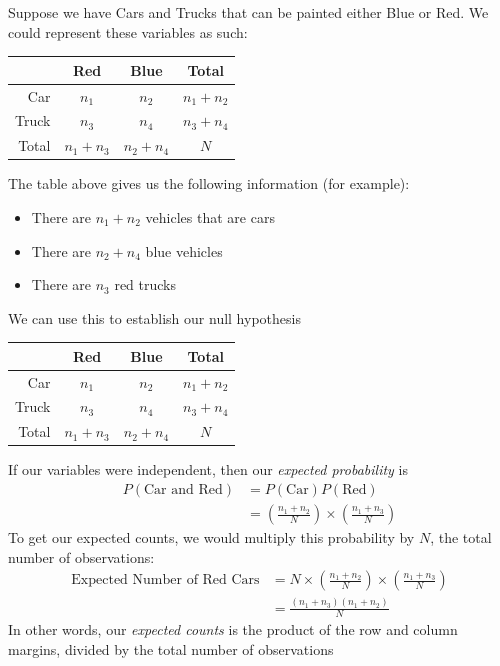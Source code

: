 \documentclass{beamer}
\begin{document}
\begin{frame}
Suppose we have Cars and Trucks that can be painted either Blue or Red. We could represent these variables as such:
\begin{table}[ht]
\centering
\begin{tabular}{rcc|c}
  \hline
 & Red & Blue & Total\\
  \hline
Car & $n_1$ & $n_2$ &  $n_1+n_2$ \\ 
Truck & $n_3$ &  $n_4$ & $n_3+n_4$ \\ 
   \hline
Total & $n_1 + n_3$ & $n_2 + n_4$ & $N$ \\ \hline
\end{tabular}
\end{table}
The table above gives us the following information (for example):
\begin{itemize}
\item There are $n_1 + n_2$ vehicles that are cars
\item There are $n_2+n_4$ blue vehicles
\item There are $n_3$ red trucks
\end{itemize}
We can use this to establish our null hypothesis
\end{frame}


\begin{frame}
\begin{table}[ht]
\centering
\begin{tabular}{rcc|c}
  \hline
 & Red & Blue & Total\\
  \hline
Car & $n_1$ & $n_2$ &  $n_1+n_2$ \\ 
Truck & $n_3$ &  $n_4$ & $n_3+n_4$ \\ 
   \hline
Total & $n_1 + n_3$ & $n_2 + n_4$ & $N$ \\ \hline
\end{tabular}
\end{table}
If our variables were independent, then our \textit{expected probability} is
\begin{align*}
P(\text{Car and Red}) &= P(\text{Car})P(\text{Red}) \\
&= \left(\frac{n_1 + n_2}{N} \right) \times \left(\frac{n_1 + n_3}{N} \right) 
\end{align*}
To get our expected counts, we would multiply this probability by $N$, the total number of observations:
\begin{align*}
\text{Expected Number of Red Cars} &= N \times  \left(\frac{n_1 + n_2}{N} \right) \times \left(\frac{n_1 + n_3}{N} \right) \\
&= \frac{(n_1 + n_3)(n_1 + n_2)}{N} 
\end{align*}
In other words, our \textit{expected counts} is the product of the row and column margins, divided by the total number of observations
\end{frame}
\end{document}
